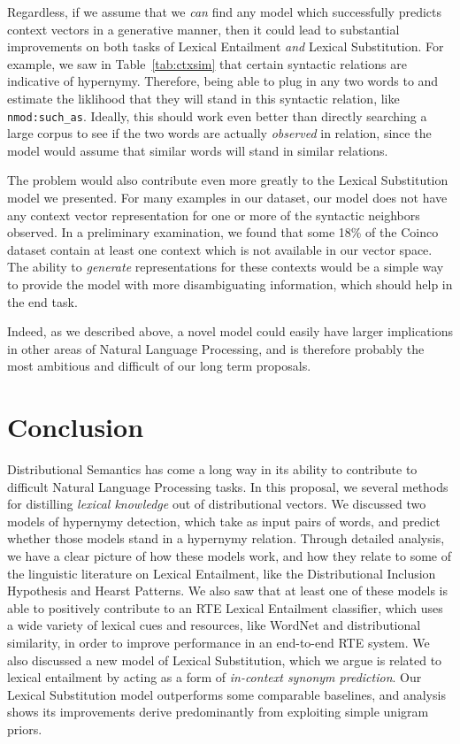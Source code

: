 \documentclass[12pt]{article}
\begin{document}
Regardless, if we assume that we {\em can} find any model which successfully
predicts context vectors in a generative manner, then it could lead to
substantial improvements on both tasks of Lexical Entailment {\em and} Lexical
Substitution. For example, we saw in Table~\ref{tab:ctxsim} that certain
syntactic relations are indicative of hypernymy. Therefore, being able to plug
in any two words to and estimate the liklihood that they will stand in this
syntactic relation, like {\tt nmod:such\_as}. Ideally, this should work even
better than directly searching a large corpus to see if the two words are
actually {\em observed} in relation, since the model would assume that similar
words will stand in similar relations.

The problem would also contribute even more greatly to the Lexical Substitution
model we presented. For many examples in our dataset, our model does not have
any context vector representation for one or more of the syntactic neighbors
observed. In a preliminary examination, we found that some 18\% of the Coinco
dataset contain at least one context which is not available in our vector space.
The ability to {\em generate} representations for these contexts would be
a simple way to provide the model with more disambiguating information, which
should help in the end task.

Indeed, as we described above, a novel model could easily have larger
implications in other areas of Natural Language Processing, and is therefore
probably the most ambitious and difficult of our long term proposals.

\section{Conclusion}

Distributional Semantics has come a long way in its ability to contribute to
difficult Natural Language Processing tasks. In this proposal, we several
methods for distilling {\em lexical knowledge} out of distributional vectors.
We discussed two models of hypernymy detection, which take as input pairs of
words, and predict whether those models stand in a hypernymy relation.  Through
detailed analysis, we have a clear picture of how these models work, and how
they relate to some of the linguistic literature on Lexical Entailment, like
the Distributional Inclusion Hypothesis and Hearst Patterns. We also saw that
at least one of these models is able to positively contribute to an RTE Lexical
Entailment classifier, which uses a wide variety of lexical cues and resources,
like WordNet and distributional similarity, in order to improve performance in
an end-to-end RTE system. We also discussed a new model of Lexical
Substitution, which we argue is related to lexical entailment by acting as a
form of {\em in-context synonym prediction}. Our Lexical Substitution model
outperforms some comparable baselines, and analysis shows its improvements
derive predominantly from exploiting simple unigram priors.
\end{document}
